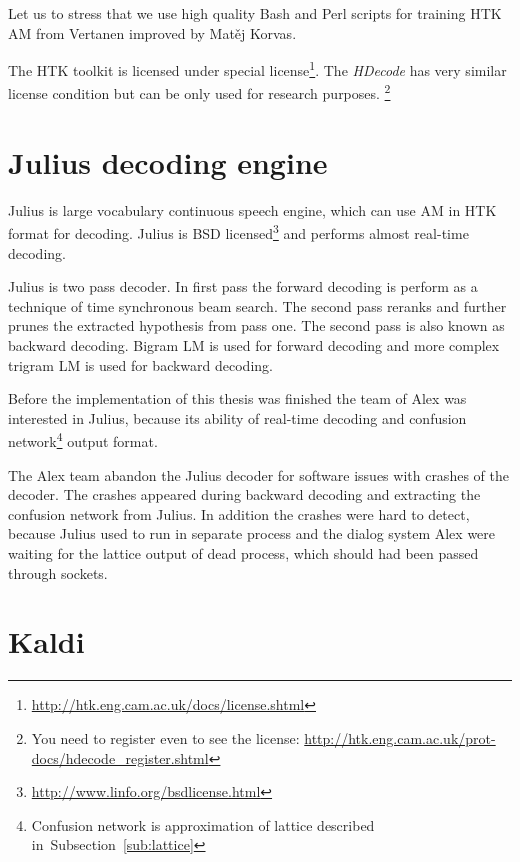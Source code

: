 Let us to stress that we use high quality Bash and Perl scripts for training \ac{HTK} \ac{AM}
from Vertanen improved by Matěj Korvas.\cite{vertanen_baseline_2006}\cite{korvas_2014}

The \ac{HTK} toolkit is licensed under special license\footnote{\url{http://htk.eng.cam.ac.uk/docs/license.shtml}}.
The {\it HDecode} has very similar license condition but can be only used for research purposes.
\footnote{You need to register even to see the license: \url{http://htk.eng.cam.ac.uk/prot-docs/hdecode_register.shtml}}

\section{Julius decoding engine}
\label{sec:back_julius}

Julius is large vocabulary continuous speech engine, which can use \ac{AM} in \ac{HTK} format for decoding.\cite{lee2009julius}
Julius is BSD licensed\footnote{\url{http://www.linfo.org/bsdlicense.html}} and performs almost real-time decoding.

Julius is two pass decoder. In first pass the forward decoding is perform as
a technique of time synchronous beam search.
The second pass reranks and further prunes the extracted hypothesis from pass one.
The second pass is also known as backward decoding.
Bigram \ac{LM} is used for forward decoding and more complex trigram \ac{LM} is used for backward decoding.

Before the implementation of this thesis was finished 
the team of Alex was interested in Julius, because its ability of real-time decoding 
and confusion 
network\footnote{Confusion network is approximation of lattice described in~Subsection~\ref{sub:lattice}} 
output format.

The Alex team abandon the Julius decoder for software issues with crashes of the decoder. 
The crashes appeared during backward decoding and extracting
the confusion network from Julius. 
In addition the crashes were hard to detect,
because Julius used to run in separate process and the dialog system Alex were waiting for the lattice output of dead process,
which should had been passed through sockets.

\section{Kaldi}
\label{sec:back_kaldi}

